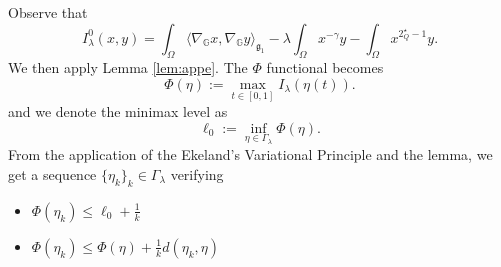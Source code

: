 \documentclass[11pt]{amsart}
\numberwithin{equation}{section} %
\theoremstyle{definition}
\def\G{\mathbb{G}}
\newcommand{\m}{\mbox}
\newcommand{\fine}{\qed\newline}
\begin{document}
Observe that
\[
I_\lambda^0(x,y)=\int_\Omega\langle \nabla_\G x,\nabla_\G y\rangle_{\mathfrak{g}_1}-\lambda\int_\Omega x^{-\gamma}y-\int_\Omega x^{2^\star_Q-1}y.
\]
We then apply Lemma \ref{lem:appe}.
The $\Phi$ functional becomes
\[
\Phi(\eta):= \max_{t\in [0,1]}I_\lambda(\eta(t)).
\]
and we denote the minimax level as
\[
\ell_0:=\inf_{\eta\in\Gamma_\lambda}\Phi(\eta).
\]
From the application of the Ekeland's Variational Principle
and the lemma, we get
a sequence $\{\eta_k\}_k\in \Gamma_\lambda$
verifying
\begin{itemize}
	\item $\Phi(\eta_k)\leq \ell_0+\frac{1}{k}$
	\item $\Phi(\eta_k)\leq \Phi(\eta)+\frac{1}{k}d(\eta_k,\eta)$
\end{itemize}
\end{document}
